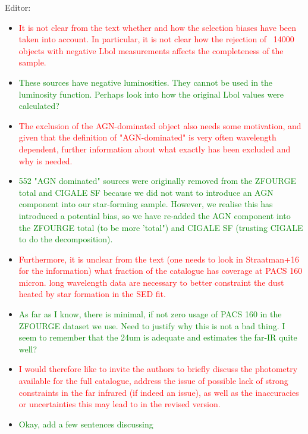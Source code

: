 Editor:
\begin{itemize}
    \item \textcolor{red}{It is not clear from the text whether and how the selection biases have been taken into account. In particular, it is not clear how the rejection of ~14000 objects with negative Lbol measurements affects the completeness of the sample.}
    \item \textcolor{Green}{These sources have negative luminosities. They cannot be used in the luminosity function. Perhaps look into how the original Lbol values were calculated?}
    \vspace{0.25cm}

    \item \textcolor{red}{The exclusion of the AGN-dominated object also needs some motivation, and given that the definition of "AGN-dominated" is very often wavelength dependent, further information about what exactly has been excluded and why is needed.}
    \item \textcolor{Green}{552 "AGN dominated" sources were originally removed from the ZFOURGE total and CIGALE SF because we did not want to introduce an AGN component into our star-forming sample. However, we realise this has introduced a potential bias, so we have re-added the AGN component into the ZFOURGE total (to be more 'total") and CIGALE SF (trusting CIGALE to do the decomposition).}
    \vspace{0.25cm}
    
    \item \textcolor{red}{Furthermore, it is unclear from the text (one needs to look in Straatman+16 for the information) what fraction of the catalogue has coverage at PACS 160 micron. long wavelength data are necessary to better constraint the dust heated by star formation in the SED fit.}
    \item \textcolor{Green}{As far as I know, there is minimal, if not zero usage of PACS 160 in the ZFOURGE dataset we use. Need to justify why this is not a bad thing. I seem to remember that the 24um is adequate and estimates the far-IR quite well?}
    \vspace{0.25cm}
    
    \item \textcolor{red}{ I would therefore like to invite the authors to briefly discuss the photometry available for the full catalogue, address the issue of possible lack of strong constraints in the far infrared (if indeed an issue), as well as the inaccuracies or uncertainties this may lead to in the revised version.}
    \item \textcolor{Green}{Okay, add a few sentences discussing}
    \vspace{0.25cm}
\end{itemize}

